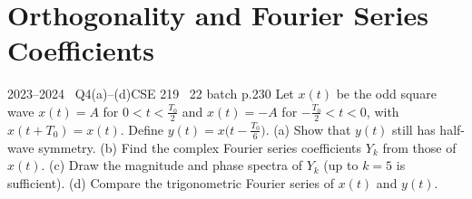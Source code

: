 \renewcommand{\teacherTag}{ANIK SIR \textbullet\ LECTURES 5--6}
\chapter{Orthogonality and Fourier Series Coefficients}


\begin{qcard}{2023--2024 \textbullet\ Q4(a)--(d)}{CSE 219 \textbullet\ 22 batch p.2}{30}
Let $x(t)$ be the odd square wave $x(t)=A$ for $0<t<\frac{T_0}2$ and $x(t)=-A$ for $-\frac{T_0}2<t<0$, with $x(t+T_0)=x(t)$. Define $y(t)=x\big(t-\frac{T_0}6\big)$.
(a) Show that $y(t)$ still has half-wave symmetry. (b) Find the complex Fourier series coefficients $Y_k$ from those of $x(t)$. (c) Draw the magnitude and phase spectra of $Y_k$ (up to $k=5$ is sufficient). (d) Compare the trigonometric Fourier series of $x(t)$ and $y(t)$.
\end{qcard}
